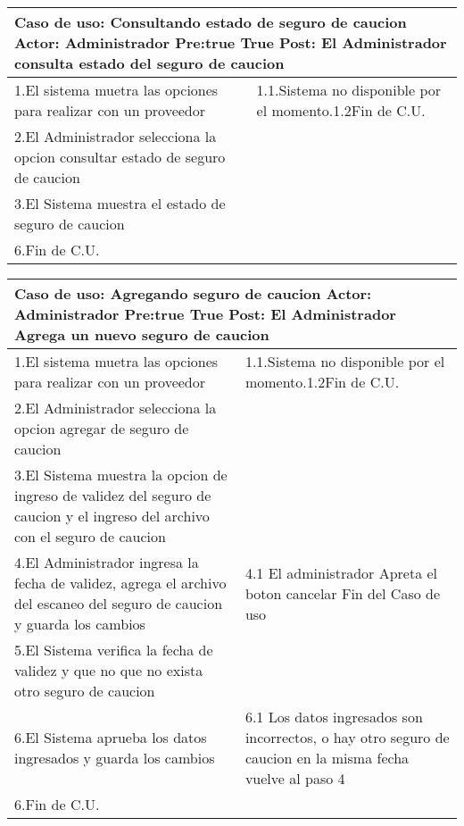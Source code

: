 \newline
\begin{tabular}{|p{8cm}|p{8cm}|}
  \hline
  \multicolumn{2}{|p{16cm}|}{
	      \textbf{Caso de uso:} Consultando estado de seguro de caucion \newline
		  \textbf{Actor:} Administrador\newline
		  \textbf{Pre:true }  True\newline
		  \textbf{Post:} El Administrador consulta estado del seguro de caucion
  }\\
  \hline
		1.El sistema  muetra las opciones para realizar con un proveedor & 1.1.Sistema no  disponible por el momento.\newline 1.2Fin de C.U.\\
		\hline
		2.El Administrador selecciona la opcion consultar estado de seguro de caucion&	\\
		\hline
		3.El Sistema muestra el estado de seguro de caucion&  \\
		\hline
		6.Fin de C.U.& \\
		\hline
  \hline
\end{tabular}

\begin{tabular}{|p{8cm}|p{8cm}|}
  \hline
  \multicolumn{2}{|p{16cm}|}{
	      \textbf{Caso de uso:} Agregando seguro de caucion\newline
		  \textbf{Actor:} Administrador\newline
		  \textbf{Pre:true }  True\newline
		  \textbf{Post:} El Administrador Agrega un nuevo seguro de caucion
  }\\
  \hline
		1.El sistema  muetra las opciones para realizar con un proveedor & 1.1.Sistema no  disponible por el momento.\newline 1.2Fin de C.U.\\
		\hline
		2.El Administrador selecciona la opcion agregar de seguro de caucion& \\
		\hline
		3.El Sistema muestra la opcion de ingreso de validez del seguro de caucion y el ingreso del archivo con el seguro de caucion&  \\
		\hline
		4.El Administrador ingresa la fecha de validez, agrega el archivo del escaneo del seguro de caucion y guarda los cambios&4.1 El administrador Apreta el boton cancelar \newline 4.2 Fin del Caso de uso \\
		\hline
		5.El Sistema verifica la fecha de validez y que no que no exista otro seguro de caucion & \\
		\hline
		6.El Sistema aprueba los datos ingresados y guarda los cambios &6.1 Los datos ingresados son incorrectos, o hay otro seguro de caucion en la misma fecha  \newline 6.2 vuelve al paso 4\\
		\hline
		6.Fin de C.U.& \\
		\hline
  \hline
\end{tabular}


